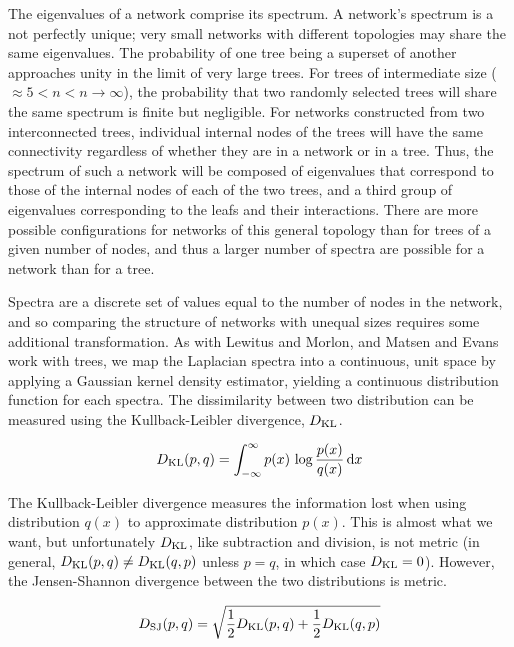 The eigenvalues of a network comprise its spectrum. A network's spectrum is a not perfectly unique; very small networks with different topologies may share the same eigenvalues. The probability of one tree being a superset of another approaches unity in the limit of very large trees. For trees of intermediate size ($ \approx 5 < n < n \rightarrow \infty$), the probability that two randomly selected trees will share the same spectrum is finite but negligible. \cite{matsen2012ubiquity} For networks constructed from two interconnected trees, individual internal nodes of the trees will have the same connectivity regardless of whether they are in a network or in a tree. Thus, the spectrum of such a network will be composed of eigenvalues that correspond to those of the internal nodes of each of the two trees, and a third group of eigenvalues corresponding to the leafs and their interactions. There are more possible configurations for networks of this general topology than for trees of a given number of nodes, and thus a larger number of spectra are possible for a network than for a tree.

Spectra are a discrete set of values equal to the number of nodes in the network, and so comparing the structure of networks with unequal sizes requires some additional transformation. As with Lewitus and Morlon, and Matsen and Evans \cite{lewitus2015characterizing, matsen2012ubiquity} work with trees, we map the Laplacian spectra into a continuous, unit space by applying a Gaussian kernel density estimator, yielding a continuous distribution function for each spectra. The dissimilarity between two distribution can be measured using the Kullback-Leibler divergence, $D_{\rm KL}$. 

\begin{equation}
    D_{\rm KL}( p, q ) = \int_{-\infty}^\infty p(x) \, \log\frac{p(x)}{q(x)} \, {\rm d}x
\end{equation}

\noindent The Kullback-Leibler divergence measures the information lost when using distribution $q(x)$ to approximate distribution $p(x)$. This is almost what we want, but unfortunately $D_{\rm KL}$, like subtraction and division, is not metric (in general, $D_{\rm KL}(p,q) \neq D_{\rm KL}(q,p)$ unless $p=q$, in which case $D_{\rm KL}=0$). However, the Jensen-Shannon divergence between the two distributions is metric.

\begin{equation}
    D_{\rm SJ}( p, q ) = \sqrt{ \frac{1}{2} D_{\rm KL}( p, q ) + \frac{1}{2} D_{\rm KL}( q, p ) }
\end{equation}


